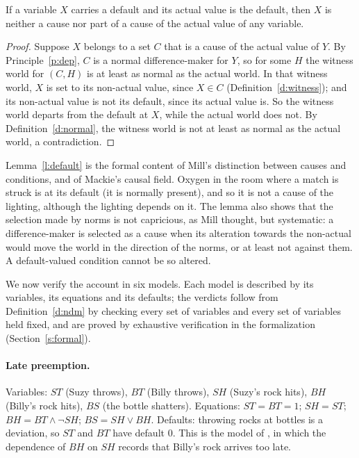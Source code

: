 \documentclass{situationist-preprint}
\begin{document}
\begin{lemma}\label{l:default}
If a variable $X$ carries a default and its actual value is the default, then $X$ is neither a cause nor part of a cause of the actual value of any variable.
\end{lemma}

\begin{proof}
Suppose $X$ belongs to a set $C$ that is a cause of the actual value of $Y$. By Principle~\ref{p:dep}, $C$ is a normal difference-maker for $Y$, so for some $H$ the witness world for $(C, H)$ is at least as normal as the actual world. In that witness world, $X$ is set to its non-actual value, since $X \in C$ (Definition~\ref{d:witness}); and its non-actual value is not its default, since its actual value is. So the witness world departs from the default at $X$, while the actual world does not. By Definition~\ref{d:normal}, the witness world is not at least as normal as the actual world, a contradiction.
\end{proof}

Lemma~\ref{l:default} is the formal content of Mill's distinction between causes and conditions, and of Mackie's causal field. Oxygen in the room where a match is struck is at its default (it is normally present), and so it is not a cause of the lighting, although the lighting depends on it. The lemma also shows that the selection made by norms is not capricious, as Mill thought, but systematic: a difference-maker is selected as a cause when its alteration towards the non-actual would move the world in the direction of the norms, or at least not against them. A default-valued condition cannot be so altered.

We now verify the account in six models. Each model is described by its variables, its equations and its defaults; the verdicts follow from Definition~\ref{d:ndm} by checking every set of variables and every set of variables held fixed, and are proved by exhaustive verification in the formalization (Section~\ref{s:formal}).

\paragraph{Late preemption.} Variables: $\mathit{ST}$ (Suzy throws), $\mathit{BT}$ (Billy throws), $\mathit{SH}$ (Suzy's rock hits), $\mathit{BH}$ (Billy's rock hits), $\mathit{BS}$ (the bottle shatters). Equations: $\mathit{ST} = \mathit{BT} = 1$; $\mathit{SH} = \mathit{ST}$; $\mathit{BH} = \mathit{BT} \wedge \neg\mathit{SH}$; $\mathit{BS} = \mathit{SH} \vee \mathit{BH}$. Defaults: throwing rocks at bottles is a deviation, so $\mathit{ST}$ and $\mathit{BT}$ have default $0$. This is the model of \citet{HalpernPearl2005}, in which the dependence of $\mathit{BH}$ on $\mathit{SH}$ records that Billy's rock arrives too late.
\end{document}
